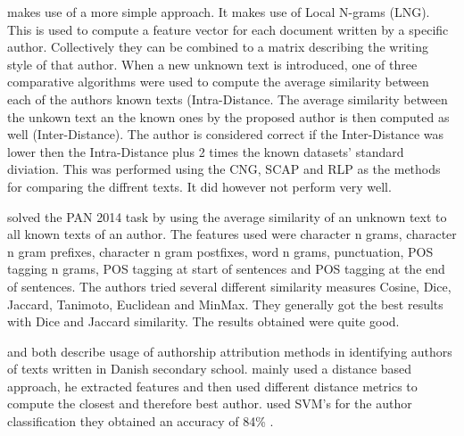 \cite{layton:2014} makes use of a more simple approach. It makes use of
Local N-grams (LNG). This is used to compute a feature vector for each
document written by a specific author. Collectively they can be combined
to a matrix describing the writing style of that author. When a new unknown
text is introduced, one of three comparative algorithms were used to compute
the average similarity between each of the authors known texts (Intra-Distance. 
The average similarity between the unkown text an the known ones by the proposed author
is then computed as well (Inter-Distance). The author is considered correct if the
Inter-Distance was lower then the Intra-Distance plus 2 times the
known datasets' standard diviation. This was performed using the CNG, SCAP and RLP
as the methods for comparing the diffrent texts. It did however not perform
very well.


\cite{castro2015} solved the PAN 2014 task by using the average similarity of an
unknown text to all known texts of an author. The features used were character n
grams, character n gram prefixes, character n gram postfixes, word n grams,
punctuation, \gls{POS} tagging n grams, \gls{POS} tagging at start of sentences
and \gls{POS} tagging at the end of sentences. The authors tried several
different similarity measures Cosine, Dice, Jaccard, Tanimoto, Euclidean and
MinMax. They generally got the best results with Dice and Jaccard similarity.
The results obtained were quite good.


\cite{hansen2014} and \cite{aalykke2016} both describe usage of authorship
attribution methods in identifying authors of texts written in Danish secondary
school. \cite{aalykke2016} mainly used a distance based approach, he extracted
features and then used different distance metrics to compute the closest and
therefore best author. \cite{hansen2014} used SVM's for the author
classification they obtained an accuracy of 84\% .
